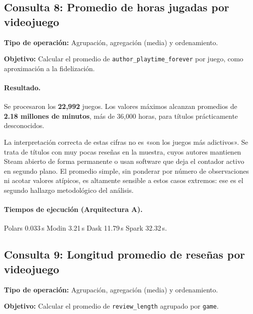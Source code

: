

\subsection{Consulta 8: Promedio de horas jugadas por videojuego}

\textbf{Tipo de operación:} Agrupación, agregación (media) y ordenamiento.

\textbf{Objetivo:} Calcular el promedio de \texttt{author\_\bk{}playtime\_\bk{}forever} por juego, como aproximación a la fidelización.


\paragraph{Resultado.}
Se procesaron los \textbf{22,992} juegos. Los valores máximos alcanzan promedios de \textbf{2.18 millones de minutos}, más de 36,000 horas, para títulos prácticamente desconocidos.

La interpretación correcta de estas cifras no es «son los juegos más adictivos». Se trata de títulos con muy pocas reseñas en la muestra, cuyos autores mantienen Steam abierto de forma permanente o usan software que deja el contador activo en segundo plano. El promedio simple, sin ponderar por número de observaciones ni acotar valores atípicos, es altamente sensible a estos casos extremos: ese es el segundo hallazgo metodológico del análisis.

\paragraph{Tiempos de ejecución (Arquitectura A).}
Polars 0.033\,s \textbar{} Modin 3.21\,s \textbar{} Dask 11.79\,s \textbar{} Spark 32.32\,s.



\subsection{Consulta 9: Longitud promedio de reseñas por videojuego}

\textbf{Tipo de operación:} Agrupación, agregación (media) y ordenamiento.

\textbf{Objetivo:} Calcular el promedio de \texttt{review\_length} agrupado por \texttt{game}.


